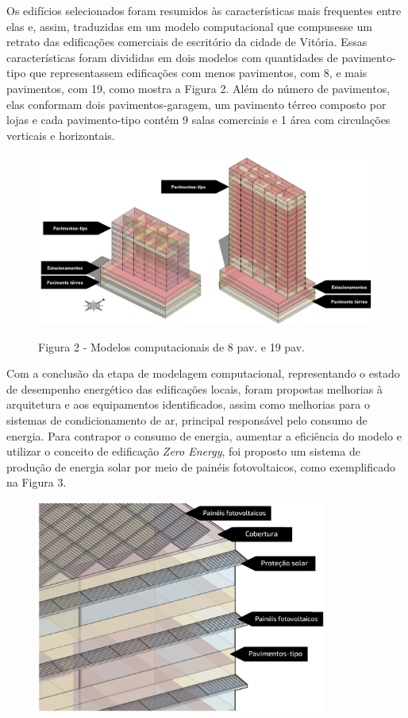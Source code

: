 \begin{onehalfspace}
    \noindent Os edifícios selecionados foram resumidos às características mais frequentes 
    entre elas e, assim, traduzidas em um modelo computacional que compusesse um retrato 
    das edificações comerciais de escritório da cidade de Vitória. Essas características 
    foram divididas em dois modelos com quantidades de pavimento-tipo que representassem 
    edificações com menos pavimentos, com 8, e mais pavimentos, com 19, como mostra a 
    Figura 2. Além do número de pavimentos, elas conformam dois pavimentos-garagem, 
    um pavimento térreo composto por lojas e cada pavimento-tipo contém 9 salas 
    comerciais e 1 área com circulações verticais e horizontais.\vspace*{0.3cm}
    \begin{figure}[H]
        \centering
        \includegraphics[width=1\textwidth]{figures/fig11_8-19-2pav.png}
        \begin{flushleft}
            \small Figura 2 - Modelos computacionais de 8 pav. e 19 pav.
        \end{flushleft}
    \end{figure}
    \noindent Com a conclusão da etapa de modelagem computacional, representando o estado de desempenho
    energético das edificações locais, foram propostas melhorias à arquitetura e aos equipamentos
    identificados, assim como melhorias para o sistemas de condicionamento de ar, principal
    responsável pelo consumo de energia. Para contrapor o consumo de energia, aumentar a
    eficiência do modelo e utilizar o conceito de edificação \textit{Zero Energy}, foi proposto
    um sistema de produção de energia solar por meio de painéis fotovoltaicos, como exemplificado
    na Figura 3.
    \begin{figure}[H]
        \centering
        \includegraphics[width=0.85\textwidth]{figures/paineis pv.png}

\end{figure}
\end{onehalfspace}

